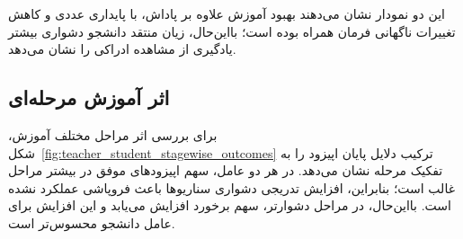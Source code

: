 این دو نمودار نشان می‌دهند بهبود آموزش علاوه بر پاداش، با پایداری عددی و کاهش تغییرات ناگهانی فرمان همراه بوده است؛ بااین‌حال، زیان منتقد دانشجو دشواری بیشتر یادگیری از مشاهده ادراکی را نشان می‌دهد.

\subsection{اثر آموزش مرحله‌ای}
\label{subsec:curriculum_effect_analysis}

برای بررسی اثر مراحل مختلف آموزش، شکل~\ref{fig:teacher_student_stagewise_outcomes} ترکیب دلایل پایان اپیزود را به تفکیک مرحله نشان می‌دهد. در هر دو عامل، سهم اپیزودهای موفق در بیشتر مراحل غالب است؛ بنابراین، افزایش تدریجی دشواری سناریوها باعث فروپاشی عملکرد نشده است. بااین‌حال، در مراحل دشوارتر، سهم برخورد افزایش می‌یابد و این افزایش برای عامل دانشجو محسوس‌تر است.


